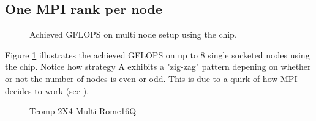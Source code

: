 \subsection{One MPI rank per node}
\begin{figure}[H]
    \centering
    \caption{Achieved GFLOPS on multi node setup using the \romeq{} chip.}
    \label{fig:gflopsromemulti}
\end{figure}

Figure \ref{fig:gflopsromemulti} illustrates the achieved GFLOPS on up to 8 single socketed nodes using the \romeq{} chip. Notice how strategy A exhibits a "zig-zag" pattern depening on whether or not the number of nodes is even or odd. This is due to a quirk of how MPI decides to work (see \cite{10064025}).

\begin{figure}[H]
    \centering
    \caption{}
    \label{fig:tromemulti}
\end{figure}

\begin{figure}[H]
    \centering
    \caption{}
    \label{fig:tcommromemulti}
\end{figure}

\begin{figure}[H]
    \centering
    \caption{Tcomp 2X4 Multi Rome16Q}
    \label{fig:tcomp_2x4_multi_rome16q}
\end{figure}


\begin{figure}[H]
    \centering
    \caption{}
    \label{fig:commlaoadromemulti}
\end{figure}
